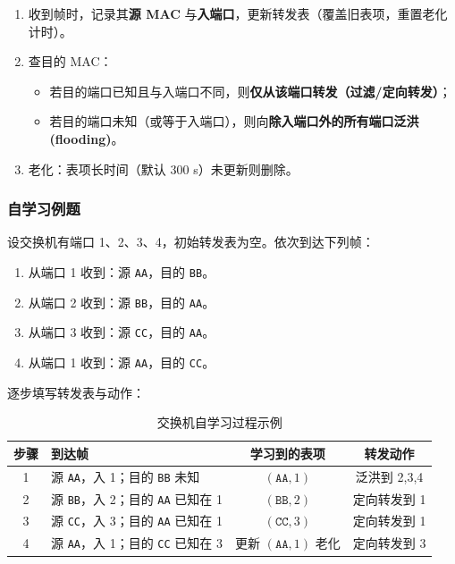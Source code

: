 \begin{enumerate}
    \item 收到帧时，记录其\textbf{源 MAC} 与\textbf{入端口}，更新转发表（覆盖旧表项，重置老化计时）。
    \item 查目的 MAC：
    \begin{itemize}
        \item 若目的端口已知且与入端口不同，则\textbf{仅从该端口转发（过滤/定向转发）}；
        \item 若目的端口未知（或等于入端口），则向\textbf{除入端口外的所有端口泛洪 (flooding)}。
    \end{itemize}
    \item 老化：表项长时间（默认 $300$ s）未更新则删除。
\end{enumerate}

\subsubsection{自学习例题}

设交换机有端口 1、2、3、4，初始转发表为空。依次到达下列帧：

\begin{enumerate}
    \item 从端口 1 收到：源 \texttt{AA}，目的 \texttt{BB}。
    \item 从端口 2 收到：源 \texttt{BB}，目的 \texttt{AA}。
    \item 从端口 3 收到：源 \texttt{CC}，目的 \texttt{AA}。
    \item 从端口 1 收到：源 \texttt{AA}，目的 \texttt{CC}。
\end{enumerate}

逐步填写转发表与动作：

\begin{table}[H]
\centering
\caption{交换机自学习过程示例}
\begin{tabulary}{\textwidth}{@{}CLCC@{}}
\toprule
\textbf{步骤} & \textbf{到达帧} & \textbf{学习到的表项} & \textbf{转发动作} \\
 & 源 \texttt{AA}，入 1；目的 \texttt{BB} 未知 & $(\texttt{AA},1)$ & 泛洪到 2,3,4 \\
2 & 源 \texttt{BB}，入 2；目的 \texttt{AA} 已知在 1 & $(\texttt{BB},2)$ & 定向转发到 1 \\
3 & 源 \texttt{CC}，入 3；目的 \texttt{AA} 已知在 1 & $(\texttt{CC},3)$ & 定向转发到 1 \\
4 & 源 \texttt{AA}，入 1；目的 \texttt{CC} 已知在 3 & 更新 $(\texttt{AA},1)$ 老化 & 定向转发到 3 \\
\bottomrule
\end{tabulary}
\end{table}

